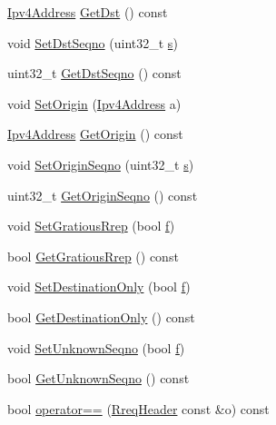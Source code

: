 \begin{DoxyCompactItemize}
\hyperlink{classns3_1_1Ipv4Address}{Ipv4\+Address} \hyperlink{classns3_1_1aodv_1_1RreqHeader_a25db1ce64330f6b382ae1badb5063fe1}{Get\+Dst} () const 
\item 
void \hyperlink{classns3_1_1aodv_1_1RreqHeader_a935c5766e595db907bdb536b4c5702bb}{Set\+Dst\+Seqno} (uint32\+\_\+t \hyperlink{generate__test__data__lte__sinr_8m_ad83eeb3a142285d1243a08c6b7026df8}{s})
\item 
uint32\+\_\+t \hyperlink{classns3_1_1aodv_1_1RreqHeader_a786be9e37f3525cc469e72de9b17c899}{Get\+Dst\+Seqno} () const 
\item 
void \hyperlink{classns3_1_1aodv_1_1RreqHeader_af737467e3033b8e720b76e58e64a9251}{Set\+Origin} (\hyperlink{classns3_1_1Ipv4Address}{Ipv4\+Address} a)
\item 
\hyperlink{classns3_1_1Ipv4Address}{Ipv4\+Address} \hyperlink{classns3_1_1aodv_1_1RreqHeader_a59ecfd6e8b99b661edd85642bb5041dc}{Get\+Origin} () const 
\item 
void \hyperlink{classns3_1_1aodv_1_1RreqHeader_acd4b6ef402f362bea06b493225f89da0}{Set\+Origin\+Seqno} (uint32\+\_\+t \hyperlink{generate__test__data__lte__sinr_8m_ad83eeb3a142285d1243a08c6b7026df8}{s})
\item 
uint32\+\_\+t \hyperlink{classns3_1_1aodv_1_1RreqHeader_a3be1b712436a7a532effddc9c0069301}{Get\+Origin\+Seqno} () const 
\item 
void \hyperlink{classns3_1_1aodv_1_1RreqHeader_aefcd57fe26873d90a1d7bd2540ac75a5}{Set\+Gratious\+Rrep} (bool \hyperlink{80211b_8c_ae7ffc1a8f84fa47a0812b2f2b9627132}{f})
\item 
bool \hyperlink{classns3_1_1aodv_1_1RreqHeader_a69e510e5038148564adc224394b42ebd}{Get\+Gratious\+Rrep} () const 
\item 
void \hyperlink{classns3_1_1aodv_1_1RreqHeader_a643bbf6f8ebd0f7ce05228f494356a25}{Set\+Destination\+Only} (bool \hyperlink{80211b_8c_ae7ffc1a8f84fa47a0812b2f2b9627132}{f})
\item 
bool \hyperlink{classns3_1_1aodv_1_1RreqHeader_a4469ca66a5371c85fb5d55dae05553d7}{Get\+Destination\+Only} () const 
\item 
void \hyperlink{classns3_1_1aodv_1_1RreqHeader_a44965513d62ea1b0fa4cd0fa7d909051}{Set\+Unknown\+Seqno} (bool \hyperlink{80211b_8c_ae7ffc1a8f84fa47a0812b2f2b9627132}{f})
\item 
bool \hyperlink{classns3_1_1aodv_1_1RreqHeader_a60a569e8460c3cd984692e21003e39b1}{Get\+Unknown\+Seqno} () const 
\item 
bool \hyperlink{classns3_1_1aodv_1_1RreqHeader_ae4d13f709fe5d8b1af9240d6d082ea95}{operator==} (\hyperlink{classns3_1_1aodv_1_1RreqHeader}{Rreq\+Header} const \&o) const 
\end{DoxyCompactItemize}
